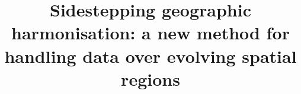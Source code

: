 \documentclass[10pt,letterpaper]{article}
\begin{document}


\doublespacing
\title{Sidestepping geographic harmonisation: a new method for handling data over evolving spatial regions}
\author{}

\maketitle






\end{document}
